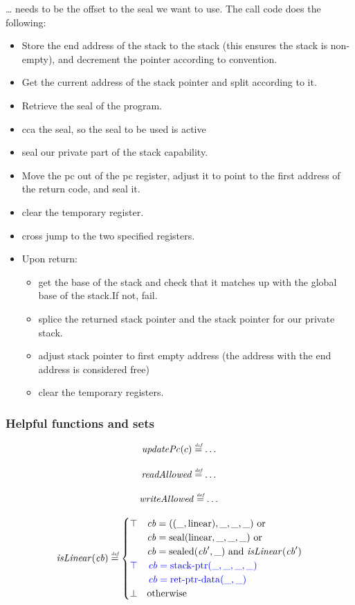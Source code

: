 \documentclass[a3paper]{article}
\newcommand{\defeq}{\stackrel{\textit{\tiny{def}}}{=}}
\newcommand{\tand}{\text{ and }}
\newcommand{\tor}{\text{ or }}
\newcommand{\totherwise}{\text{otherwise }}
\newcommand{\sourcecolor}{\color{blue}}
\newcommand{\src}[1]{{\sourcecolor #1}}
\newcommand{\shareddom}[1]{\mathrm{#1}}
\newcommand{\stkptr}[1]{\mathrm{stack\text{-}ptr}(#1)}
\newcommand{\retptrd}{\mathrm{ret\text{-}ptr\text{-}data}}
\newcommand{\seal}[1]{\shareddom{seal}(#1)}
\newcommand{\sealed}[1]{\shareddom{sealed}(#1)}
\newcommand{\var}[1]{\mathit{#1}}
\newcommand{\cb}{\var{cb}}
\newcommand{\plainlinearity}[1]{\mathrm{#1}}
\newcommand{\linear}{\plainlinearity{linear}}
\newcommand{\plainfun}[2]{
  \ifthenelse{\equal{#2}{}}
  {\mathit{#1}}
  {\mathit{#1}(#2)}
}
\newcommand{\isLinear}[1]{\plainfun{isLinear}{#1}}
\newcommand{\readAllowed}[1]{\plainfun{readAllowed}{#1}}
\newcommand{\updPcAddr}[1]{\plainfun{updatePc}{#1}}
\newcommand{\writeAllowed}[1]{\plainfun{writeAllowed}{#1}}
\begin{document}
{\color{red} \dots} needs to be the offset to the seal we want to use.
The call code does the following:
\begin{itemize}
\item Store the end address of the stack to the stack (this ensures the stack is non-empty), and decrement the pointer according to convention.
\item Get the current address of the stack pointer and split according to it.
\item Retrieve the seal of the program.
\item cca the seal, so the seal to be used is active 
\item seal our private part of the stack capability.
\item Move the pc out of the pc register, adjust it to point to the first address of the return code, and seal it.
\item clear the temporary register.
\item cross jump to the two specified registers.
\item Upon return:
  \begin{itemize}
  \item get the base of the stack and check that it matches up with the global base of the stack.If not, fail.
  \item splice the returned stack pointer and the stack pointer for our private stack.
  \item adjust stack pointer to first empty address (the address with the end address is considered free)  
  \item clear the temporary registers.
  \end{itemize}
\end{itemize}

\subsubsection{Helpful functions and sets}


\[
  \updPcAddr{c} \defeq \dots
\]

\[
  \readAllowed{} \defeq \dots
\]

\[
  \writeAllowed{} \defeq \dots
\]

\[
  \isLinear{\cb} \defeq
  \begin{cases}
    \top & 
    \arraycolsep=0pt
    \begin{array}[t]{l}
      \cb = ((\_,\linear),\_,\_,\_) \tor\\
      \cb = \seal{\linear,\_,\_,\_} \tor\\
      \cb = \sealed{\cb',\_} \tand \isLinear{\cb'} 
    \end{array}\\
    \src{\top} & 
    \sourcecolor\left.
    \arraycolsep=0pt
    \begin{array}[t]{l}
      \cb = \stkptr{\_,\_,\_,\_}\\
      \cb = \retptrd(\_,\_)
    \end{array}\right.\\
    \bot & \totherwise
  \end{cases}
\]
\end{document}
